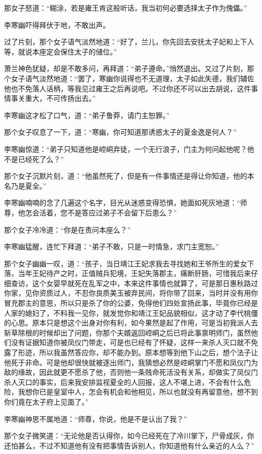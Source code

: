 那女子怒道：“糊涂，若是雍王肯这般听话，我当初何必要选择太子作为傀儡。”

李寒幽吓得拜伏于地，不敢出声。

过了片刻，那个女子语气淡然地道：“好了，兰儿，你先回去安抚太子妃和上下人等，就说本座定会保住太子的储位。”

萧兰神色犹疑，却是不敢多问，再拜道：“弟子遵命。”悄然退出。又过了片刻，那个女子语气淡然地道：“罢了，寒幽你说得也不无道理，太子如此失德，我们辅佐他也不免落人话柄，等我见过雍王之后再说吧。不过你还不可以出去胡说，这件事情事关重大，不可传扬出去。”

李寒幽这才松了口气，道：“弟子鲁莽，请门主恕罪。”

那个女子叹息了一下，道：“寒幽，你可知道那诱惑太子的夏金逸是何人？”

李寒幽惊道：“弟子只知道他是崆峒弃徒，一个无行浪子，门主为何问起他呢？他不是已经死了么？”

那个女子沉默片刻，道：“他虽然死了，但是有一件事情还是得让你知道，他的本名乃是夏全。”

李寒幽喃喃的念了几遍这个名字，目光从迷惑变得恐惧，她面如死灰地道：“师尊，他怎会活着，您不是答应过弟子不会留下后患么？”

那个女子冷冷道：“你是在责问本座么？”

李寒幽猛醒，连忙下拜道：“弟子不敢，只是一时情急，求门主宽恕。”

那个女子幽幽一叹，道：“孩子，当日靖江王妃求我去寻找她和王爷所生的爱女下落，当年王妃待产之时，正值贼兵犯境，王妃失落郡主，痛断肝肠，可惜我后来仔细查访，这个女婴早就死在乱军之中，本来这件事情也就算了，可是那日惠秋路过你家，见你资质过人，不忍你良质美玉被弃民间，将你带了回来，当时并没有用你冒充郡主的意思，所以只是杀了你的公婆，免得他们四处宣扬此事，毕竟你已经是人家的媳妇了，不料我一见你，就发觉你和靖江王妃品貌相似，这才动了李代桃僵的心思。原本只是想这个出身对你有利，如今果然是起了作用，可是当初我派人去斩草除根的时候却出了问题，你那个夫婿返回崆峒之后已将此事禀明师门，虽然他们没有证据知道你被凤仪门带走，可是也已经有了怀疑，这样一来杀人灭口就不免露了形迹，所以我虽然答应你，却不能办到。原本想等到他下山之后，想个法子让他死于非命。可是他却很快就被逐出师门，我猜想必然是崆峒掌门不愿和凤仪门为敌的缘故，因此就更不愿杀了他，否则他一条贱命死活没有关系，却做实了凤仪门杀人灭口的事实，后来我安排监视夏全的人回报，这人不堪上进，不会有什么危险，我想你已是皇室中人，怎会有机会和他相见，所以也就没有再留意他，想不到你们竟在太子府上见面了。”

李寒幽神思不属地道：“师尊，你说，他是不是认出了我？”

那个女子微笑道：“无论他是否认得你，如今已经死在了冷川掌下，尸骨成灰，你还怕甚么，不过不知道他有没有把事情告诉别人，你知道他有什么亲近的人么？”

